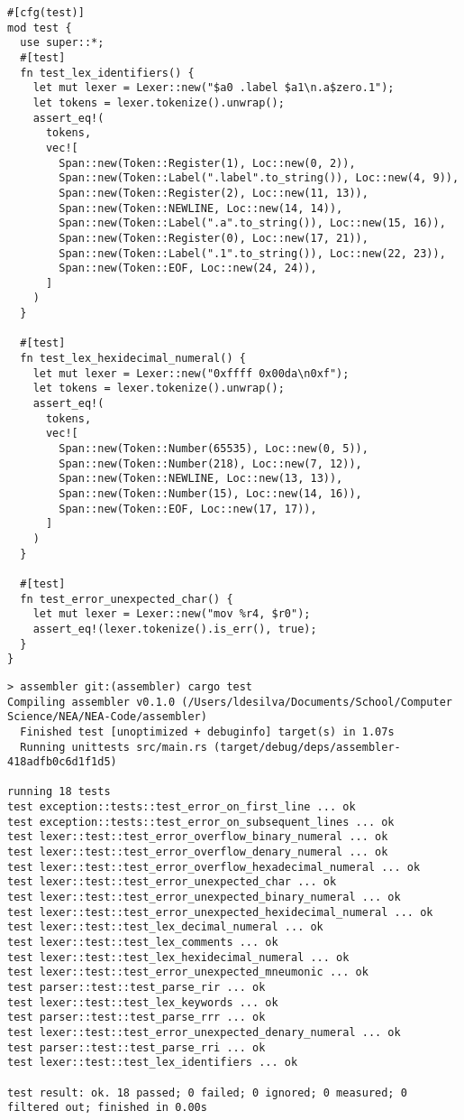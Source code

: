 \begin{lstlisting}
#[cfg(test)]
mod test {
  use super::*;
  #[test]
  fn test_lex_identifiers() {
    let mut lexer = Lexer::new("$a0 .label $a1\n.a$zero.1");
    let tokens = lexer.tokenize().unwrap();
    assert_eq!(
      tokens,
      vec![
        Span::new(Token::Register(1), Loc::new(0, 2)),
        Span::new(Token::Label(".label".to_string()), Loc::new(4, 9)),
        Span::new(Token::Register(2), Loc::new(11, 13)),
        Span::new(Token::NEWLINE, Loc::new(14, 14)),
        Span::new(Token::Label(".a".to_string()), Loc::new(15, 16)),
        Span::new(Token::Register(0), Loc::new(17, 21)),
        Span::new(Token::Label(".1".to_string()), Loc::new(22, 23)),
        Span::new(Token::EOF, Loc::new(24, 24)),
      ]
    )
  }

  #[test]
  fn test_lex_hexidecimal_numeral() {
    let mut lexer = Lexer::new("0xffff 0x00da\n0xf");
    let tokens = lexer.tokenize().unwrap();
    assert_eq!(
      tokens,
      vec![
        Span::new(Token::Number(65535), Loc::new(0, 5)),
        Span::new(Token::Number(218), Loc::new(7, 12)),
        Span::new(Token::NEWLINE, Loc::new(13, 13)),
        Span::new(Token::Number(15), Loc::new(14, 16)),
        Span::new(Token::EOF, Loc::new(17, 17)),
      ]
    )
  }

  #[test]
  fn test_error_unexpected_char() {
    let mut lexer = Lexer::new("mov %r4, $r0");
    assert_eq!(lexer.tokenize().is_err(), true);
  }
}
\end{lstlisting}

\begin{lstlisting}
> assembler git:(assembler) cargo test
Compiling assembler v0.1.0 (/Users/ldesilva/Documents/School/Computer Science/NEA/NEA-Code/assembler)
  Finished test [unoptimized + debuginfo] target(s) in 1.07s
  Running unittests src/main.rs (target/debug/deps/assembler-418adfb0c6d1f1d5)

running 18 tests
test exception::tests::test_error_on_first_line ... ok
test exception::tests::test_error_on_subsequent_lines ... ok
test lexer::test::test_error_overflow_binary_numeral ... ok
test lexer::test::test_error_overflow_denary_numeral ... ok
test lexer::test::test_error_overflow_hexadecimal_numeral ... ok
test lexer::test::test_error_unexpected_char ... ok
test lexer::test::test_error_unexpected_binary_numeral ... ok
test lexer::test::test_error_unexpected_hexidecimal_numeral ... ok
test lexer::test::test_lex_decimal_numeral ... ok
test lexer::test::test_lex_comments ... ok
test lexer::test::test_lex_hexidecimal_numeral ... ok
test lexer::test::test_error_unexpected_mneumonic ... ok
test parser::test::test_parse_rir ... ok
test lexer::test::test_lex_keywords ... ok
test parser::test::test_parse_rrr ... ok
test lexer::test::test_error_unexpected_denary_numeral ... ok
test parser::test::test_parse_rri ... ok
test lexer::test::test_lex_identifiers ... ok

test result: ok. 18 passed; 0 failed; 0 ignored; 0 measured; 0 filtered out; finished in 0.00s
\end{lstlisting}